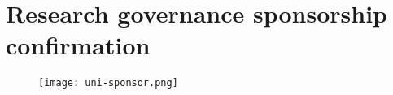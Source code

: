 
\chapter{Research governance sponsorship confirmation}
\label{appendixe}

\begin{figure}[htbp]
\centerline{\texttt{[image: uni-sponsor.png]}}
\label{sponsform}
\end{figure}
